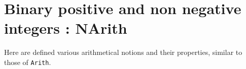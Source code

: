 \section{Binary positive and non negative integers : NArith}\label{NArith}

Here are defined various arithmetical notions and their properties,
similar to those of {\tt Arith}.

